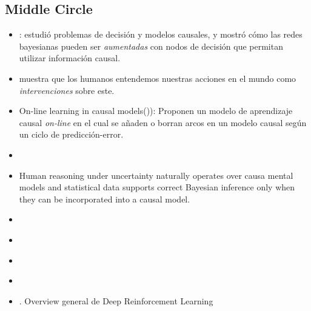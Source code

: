 \documentclass[11pt]{article}
\theoremstyle{plain}
\begin{document}
\subsection{Middle Circle}
\begin{itemize}
\item: \cite{dawid2002influence} estudió problemas de decisión y modelos causales, y mostró cómo las redes bayesianas pueden ser \textit{aumentadas} con nodos de decisión que permitan utilizar información causal.
\item \cite{hagmayer2009decision} muestra que los humanos entendemos nuestras acciones en el mundo como \textit{intervenciones} sobre este. 
\item On-line learning in causal models(\cite{wellen2012learning})):  Proponen un modelo de aprendizaje causal \textit{on-line} en el cual se añaden o borran arcos en un modelo causal según un ciclo de predicción-error.
\item \cite{lopez2015towards}
\item \cite{krynski2007role} Human reasoning under uncertainty naturally operates over causa mental models and statistical data supports correct Bayesian inference only when they can be incorporated into a causal model. 
\item \cite{van2016deep}
\item \cite{goudet2017learning}
\item \cite{leibo2017multi}
\item \cite{hernandez2017survey}
\item \cite{li2017deep}. Overview general de Deep Reinforcement Learning

\end{itemize}
\end{document}
